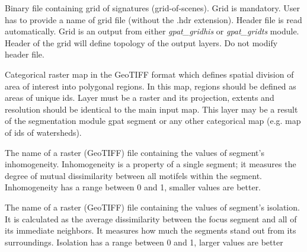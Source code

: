 
Binary file containing grid of signatures (grid-of-scenes). 
Grid is mandatory. 
User has to provide a name of grid file (without the .hdr extension). 
Header file is read automatically. 
Grid is an output from either {\it gpat\_gridhis} or {\it gpat\_gridts} module. 
Header of the grid will define topology of the output layers. 
Do not modify header file.


Categorical raster map in the GeoTIFF format which defines spatial division of area of interest into polygonal regions.
In this map, regions should be defined as areas of unique ids.
Layer must be a raster and its projection, extents and resolution should be identical to the main input map. 
This layer may be a result of the segmentation module gpat segment or any other categorical map (e.g. map of ids of watersheds).


The name of a raster (GeoTIFF) file containing the values of segment's inhomogeneity. 
Inhomogeneity is a property of a single segment; it measures the degree of mutual dissimilarity between all motifels within the segment.
Inhomogeneity has a range between 0 and 1, smaller values are better.


The name of a raster (GeoTIFF) file containing the values of segment's isolation. 
It is calculated as the average dissimilarity between the focus segment and all of its immediate neighbors.
It measures how much the segments stand out from its surroundings. 
Isolation has a range between 0 and 1, larger values are better


